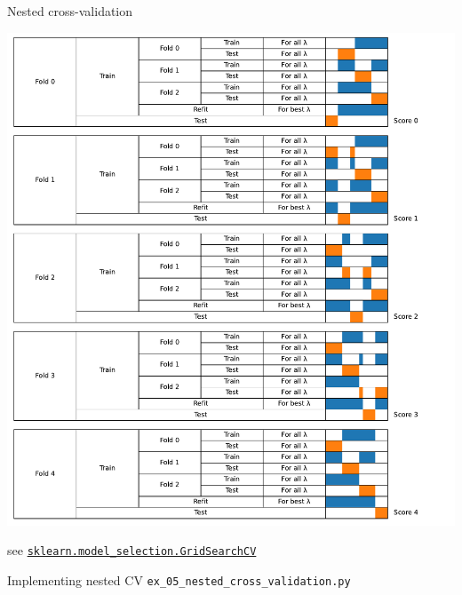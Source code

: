 \documentclass[presentation,mathserif,table]{beamer}
\begin{document}
\begin{frame}[label={sec:orgf8e1d92},fragile]{Nested cross-validation}
 \begin{center}
\includegraphics[width=.9\linewidth]{cv_figure_nested.pdf}
\end{center}
see  \href{https://scikit-learn.org/stable/modules/generated/sklearn.model\_selection.GridSearchCV.html}{\texttt{sklearn.model\_selection.GridSearchCV}}
\end{frame}
\begin{frame}[label={sec:org23ac710},fragile]{Implementing nested CV}
 \texttt{ex\_05\_nested\_cross\_validation.py}
\end{frame}
\end{document}
